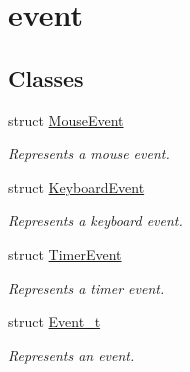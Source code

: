 \hypertarget{group__event}{}\section{event}
\label{group__event}
\subsection*{Classes}
\begin{DoxyCompactItemize}
\item 
struct \mbox{\hyperlink{struct_mouse_event}{Mouse\+Event}}
\begin{DoxyCompactList}\small\item\em Represents a mouse event. \end{DoxyCompactList}\item 
struct \mbox{\hyperlink{struct_keyboard_event}{Keyboard\+Event}}
\begin{DoxyCompactList}\small\item\em Represents a keyboard event. \end{DoxyCompactList}\item 
struct \mbox{\hyperlink{struct_timer_event}{Timer\+Event}}
\begin{DoxyCompactList}\small\item\em Represents a timer event. \end{DoxyCompactList}\item 
struct \mbox{\hyperlink{struct_event__t}{Event\+\_\+t}}
\begin{DoxyCompactList}\small\item\em Represents an event. \end{DoxyCompactList}\end{DoxyCompactItemize}
